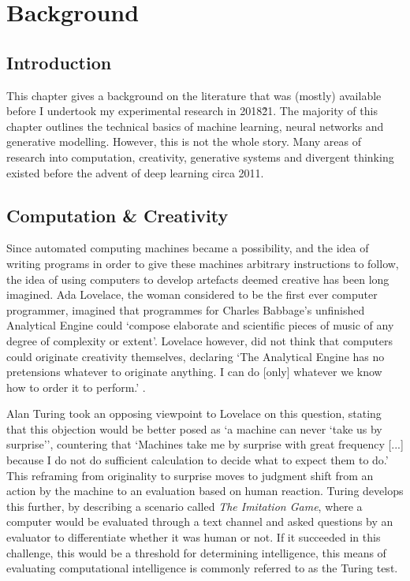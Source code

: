 \chapter{Background}
\label{ch:background}

\section{Introduction}

This chapter gives a background on the literature that was (mostly) available before I undertook my experimental research in 2018\~21. 
The majority of this chapter outlines the technical basics of machine learning, neural networks and generative modelling. 
However, this is not the whole story. Many areas of research into computation, creativity, generative systems and divergent thinking existed before the advent of deep learning circa 2011. 

\section{Computation \& Creativity}

Since automated computing machines became a possibility, and the idea of writing programs in order to give these machines arbitrary instructions to follow, the idea of using computers to develop artefacts deemed creative has been long imagined. 
Ada Lovelace, the woman considered to be the first ever computer programmer, imagined that programmes for Charles Babbage's unfinished Analytical Engine could ‘compose elaborate and scientific pieces of music of any degree of complexity or extent’.
Lovelace however, did not think that computers could originate creativity themselves, declaring ‘The Analytical Engine has no pretensions whatever to originate anything. I can do [only] whatever we know how to order it to perform.' \citep{lovelace1843notes}.

Alan Turing took an opposing viewpoint to Lovelace on this question, stating that this objection would be better posed as ‘a machine can never ‘take us by surprise’’, countering that ‘Machines take me by surprise with great frequency [...] because I do not do sufficient calculation to decide what to expect them to do.’  \citep{machinery1950computing}
This reframing from originality to surprise moves to judgment shift from an action by the machine to an evaluation based on human reaction. 
Turing develops this further, by describing a scenario called \textit{The Imitation Game}, where a computer would be evaluated through a text channel and asked questions by an evaluator to differentiate whether it was human or not. 
If it succeeded in this challenge, this would be a threshold for determining intelligence,
this means of evaluating computational intelligence is commonly referred to as the Turing test. 

